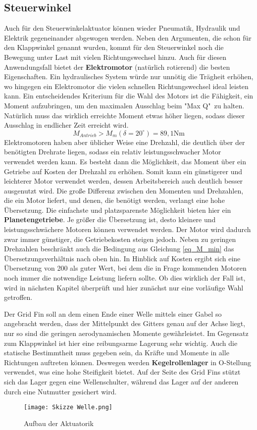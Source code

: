 \subsection{Steuerwinkel}
Auch für den Steuerwinkelaktuator können wieder Pneumatik, Hydraulik und Elektrik gegeneinander abgewogen werden. Neben den Argumenten, die schon für den Klappwinkel genannt wurden, kommt für den Steuerwinkel noch die Bewegung unter Last mit vielen Richtungswechsel hinzu. Auch für diesen Anwendungsfall bietet der \textbf{Elektromotor} (natürlich rotierend) die besten Eigenschaften. Ein hydraulisches System würde nur unnötig die Trägheit erhöhen, wo hingegen ein Elektromotor die vielen schnellen Richtungswechsel ideal leisten kann.
Ein entscheidendes Kriterium für die Wahl des Motors ist die Fähigkeit, ein Moment aufzubringen, um den maximalen Ausschlag beim "Max Q"\ zu halten. Natürlich muss das wirklich erreichte Moment etwas höher liegen, sodass dieser Ausschlag in endlicher Zeit erreicht wird.
\begin{equation}\label{eq_M_min}
	M_{Antrieb} > M_m(\delta = 20^\circ) = 89,1\mathrm{Nm}
\end{equation}
Elektromotoren haben aber üblicher Weise eine Drehzahl, die deutlich über der benötigten Drehrate liegen, sodass ein relativ leistungsschwacher Motor verwendet werden kann. Es besteht dann die Möglichkeit, das Moment über ein Getriebe auf Kosten der Drehzahl zu erhöhen. Somit kann ein günstigerer und leichterer Motor verwendet werden, dessen Arbeitsbereich auch deutlich besser ausgenutzt wird. Die große Differenz zwischen den Momenten und Drehzahlen, die ein Motor liefert, und denen, die benötigt werden, verlangt eine hohe Übersetzung. Die einfachste und platzsparenste Möglichkeit bieten hier ein \textbf{Planetengetriebe}. Je größer die Übersetzung ist, desto kleinere und leistungsschwächere Motoren können verwendet werden. Der Motor wird dadurch zwar immer günstiger, die Getriebekosten steigen jedoch. Neben zu geringen Drehzahlen beschränkt auch die Bedingung aus Gleichung \ref{eq_M_min} das Übersetzungsverhältnis nach oben hin. In Hinblick auf Kosten ergibt sich eine Übersetzung von 200 als guter Wert, bei dem die in Frage kommenden Motoren noch immer die notwendige Leistung liefern sollte. Ob dies wirklich der Fall ist, wird in nächsten Kapitel überprüft und hier zunächst nur eine vorläufige Wahl getroffen.

Der Grid Fin soll an dem einen Ende einer Welle mittels einer Gabel so angebracht werden, dass der Mittelpunkt des Gitters genau auf der Achse liegt, nur so sind die geringen aerodynamischen Momente gewährleistet. Im Gegensatz zum Klappwinkel ist hier eine reibungsarme Lagerung sehr wichtig. Auch die statische Bestimmtheit muss gegeben sein, da Kräfte und Momente in alle Richtungen auftreten können. Deswegen werden \textbf{Kegelrollenlager} in O-Stellung verwendet, was eine hohe Steifigkeit bietet. Auf der Seite des Grid Fins stützt sich das Lager gegen eine Wellenschulter, während das Lager auf der anderen durch eine Nutmutter gesichert wird.
\begin{figure}[h]
	\centering
	\texttt{[image: Skizze Welle.png]}
	\caption{Aufbau der Aktuatorik}
	\label{abb_Welle}
\end{figure}\\

